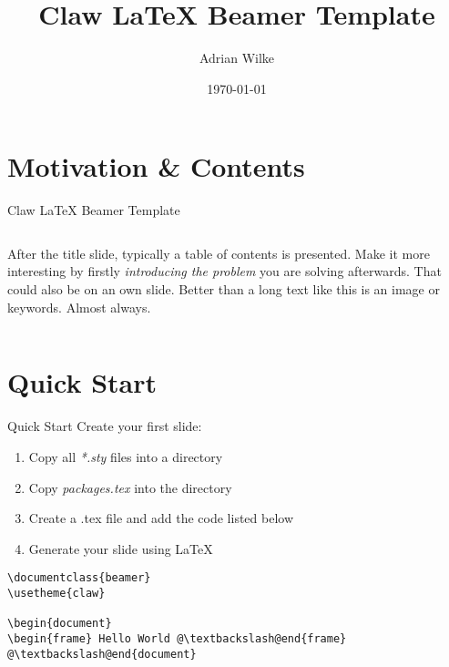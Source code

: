 \documentclass{beamer}
\title[Claw LaTeX Beamer Template]{Claw LaTeX Beamer Template}
\subtitle{}
\date{\today}
\author[A.~Wilke]{Adrian Wilke}
\institute[DICE]{DICE Group\\Paderborn University}
\begin{document}
{\usebackgroundtemplate{}
\frame[plain]{\titlepage}}


\addtocounter{framenumber}{-1}

\section{Motivation \& Contents}

\begin{frame}{Claw LaTeX Beamer Template}
	\begin{columns}[T]
		After the title slide, typically a table of contents is presented. Make it more interesting by firstly \emph{introducing the problem} you are solving afterwards. That could also be on an own slide. Better than a long text like this is an image or keywords. Almost always.
		\vspace*{.2cm}
		\hypersetup{linkcolor=textblue}
		\tableofcontents
	\end{columns}
\end{frame}

\section{Quick Start}
\begin{frame}[fragile]{Quick Start}
	Create your first slide:
	\begin{enumerate}
		\item Copy all \emph{*.sty} files into a directory
		\item Copy \emph{packages.tex} into the directory
		\item Create a .tex file and add the code listed below
		\item Generate your slide using LaTeX
	\end{enumerate}
	\begin{lstlisting}[caption={Minimal Example}]
\documentclass{beamer}
\usetheme{claw}

\begin{document}
\begin{frame} Hello World @\textbackslash@end{frame}
@\textbackslash@end{document}
	\end{lstlisting}
\end{frame}
\end{document}
